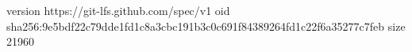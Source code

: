 version https://git-lfs.github.com/spec/v1
oid sha256:9e5bdf22c79dde1fd1c8a3cbc191b3c0c691f84389264fd1c22f6a35277c7feb
size 21960
